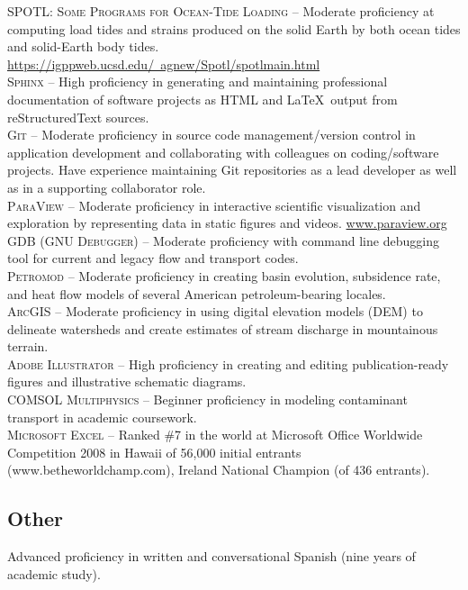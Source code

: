 \documentclass[11pt, letterpaper]{article}
\begin{document}
\textsc{SPOTL: Some Programs for Ocean-Tide Loading} – Moderate proficiency at
computing load tides and strains produced on the solid Earth by both ocean
tides and solid-Earth body tides.
\href{https://igppweb.ucsd.edu/~agnew/Spotl/spotlmain.html}{https://igppweb.ucsd.edu/~agnew/Spotl/spotlmain.html}\\[5pt]
\textsc{Sphinx} – High proficiency in generating and maintaining professional
documentation of software projects as HTML and \LaTeX \ output from
reStructuredText sources.\\[5pt]
\textsc{Git} – Moderate proficiency in source code management/version control
in application development and collaborating with colleagues on coding/software
projects. Have experience maintaining Git repositories as a lead developer as
well as in a supporting collaborator role.\\[5pt]
\textsc{ParaView} – Moderate proficiency in interactive scientific
visualization and exploration by representing data in static figures and
videos. \href{https://www.paraview.org/}{www.paraview.org} \\[5pt]
\textsc{GDB (GNU Debugger)} – Moderate proficiency with command line debugging
tool for current and legacy flow and transport codes.\\[5pt] 
\textsc{Petromod} – Moderate proficiency in creating basin evolution,
subsidence rate, and heat flow models of several American petroleum-bearing
locales.\\[5pt] 
\textsc{ArcGIS} – Moderate proficiency in using digital elevation models (DEM)
to delineate watersheds and create estimates of stream discharge in mountainous
terrain.\\[5pt] 
\textsc{Adobe Illustrator} – High proficiency in creating and editing
publication-ready figures and illustrative schematic diagrams.\\[5pt] 
\textsc{COMSOL Multiphysics} – Beginner proficiency in modeling contaminant
transport in academic coursework.\\[5pt] 
\textsc{Microsoft Excel} – Ranked \#7 in the world at Microsoft Office
Worldwide Competition 2008 in Hawaii of 56,000 initial entrants
(www.betheworldchamp.com), Ireland National Champion (of 436 entrants).
\subsection*{Other}
\noindent
Advanced proficiency in written and conversational Spanish (nine years of
academic study).
\end{document}
